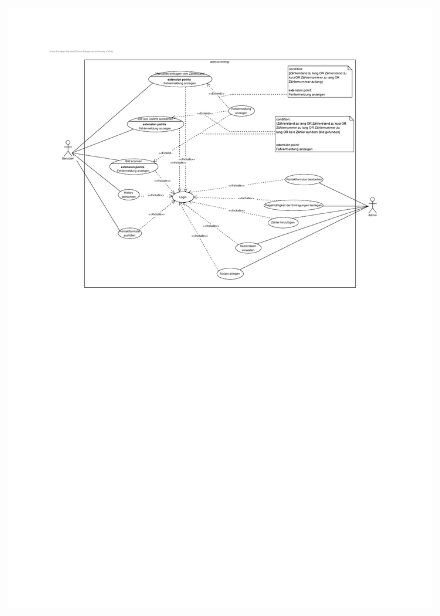 \begin{figure}[h]

	\hspace{-5cm}
	\includegraphics[width=25 cm, height = 45cm]{./img/mustCase}
\end{figure}

